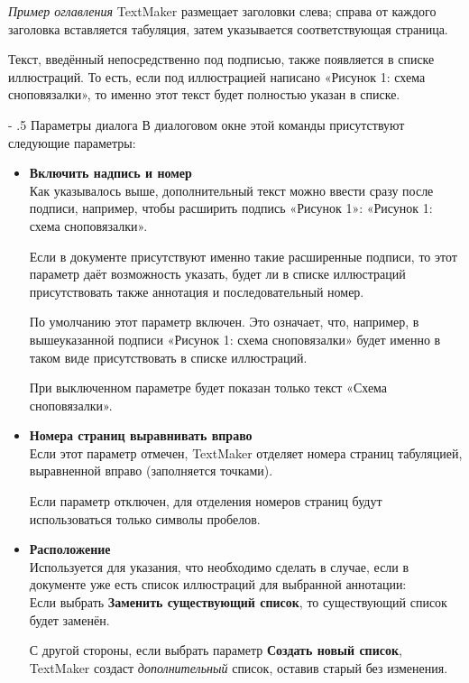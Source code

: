 ﻿\documentclass[a4paper,10pt]{article}
\makeatletter
\renewcommand\paragraph{%
   \@startsection{paragraph}{4}{0mm}%
      {-\baselineskip}%
      {.5\baselineskip}%
      {\normalfont\normalsize\bfseries}}
\makeatother
\begin{document}
{\footnotesize \textit{Пример оглавления}}
\newline
\newline
TextMaker размещает заголовки слева; справа от каждого заголовка вставляется табуляция, затем указывается соответствующая страница.

Текст, введённый непосредственно под подписью, также появляется в списке иллюстраций. То есть, если под иллюстрацией написано «Рисунок 1: схема сноповязалки», то именно этот текст будет полностью указан в списке.

\paragraph{Параметры диалога}
В диалоговом окне этой команды присутствуют следующие параметры:
\begin{itemize}
 \item \textbf{Включить надпись и номер}\\
 Как указывалось выше, дополнительный текст можно ввести сразу после подписи, например, чтобы расширить подпись «Рисунок 1»: «Рисунок 1: схема сноповязалки».
 
 Если в документе присутствуют именно такие расширенные подписи, то этот параметр даёт возможность указать, будет ли в списке иллюстраций присутствовать также аннотация и последовательный номер.
 
 По умолчанию этот параметр включен. Это означает, что, например, в вышеуказанной подписи «Рисунок 1: схема сноповязалки» будет именно в таком виде присутствовать в списке иллюстраций.
 
 При выключенном параметре будет показан только текст «Схема сноповязалки».
 \item \textbf{Номера страниц выравнивать вправо}\\
 Если этот параметр отмечен, TextMaker отделяет номера страниц табуляцией, выравненной вправо (заполняется точками).
 
 Если параметр отключен, для отделения номеров страниц будут использоваться только символы пробелов.
 \item \textbf{Расположение}\\
 Используется для указания, что необходимо сделать в случае, если в документе уже есть список иллюстраций для выбранной аннотации:\\
 Если выбрать \textbf{Заменить существующий список}, то существующий список будет заменён.
 
 С другой стороны, если выбрать параметр \textbf{Создать новый список}, TextMaker создаст \textit{дополнительный} список, оставив старый без изменения.
\end{itemize}
\end{document}
